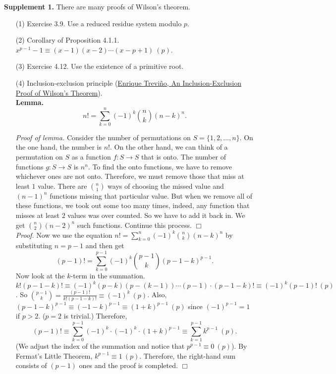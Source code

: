 \documentclass{article}
\begin{document}
\textbf{Supplement 1.}
There are many proofs of Wilson's theorem.
\begin{enumerate}
\item[(1)]
Exercise 3.9. Use a reduced residue system modulo $p$.
\item[(2)]
Corollary of Proposition 4.1.1. $x^{p - 1} - 1 \equiv (x - 1)(x - 2) \cdots (x - p + 1) \: (p)$.
\item[(3)]
Exercise 4.12. Use the existence of a primitive root.
\item[(4)]
Inclusion-exclusion principle
(\href{http://campus.lakeforest.edu/trevino/WilsonCapsule.pdf}
{Enrique Treviño, An Inclusion-Exclusion Proof of Wilson's Theorem}). \\
\textbf{Lemma.}
$$n! = \sum_{k = 0}^{n}(-1)^k {n \choose k} (n - k)^{n}.$$

\emph{Proof of lemma.}
Consider the number of permutations on $S = \{1, 2, ..., n\}$.
On the one hand, the number is $n!$.
On the other hand, we can think of a permutation on $S$ as a function
$f: S \rightarrow S$ that is onto.
The number of functions $g: S \rightarrow S$ is $n^n$.
To find the onto functions, we have to remove whichever ones are not onto.
Therefore, we must remove those that miss at least $1$ value.
There are ${n \choose 1}$ ways of choosing the missed value and ${(n - 1)}^n$
functions missing that particular value.
But when we remove all of these functions, we took out some too many times, indeed,
any function that misses at least $2$ values was over counted. So we have to add it back in.
We get ${n \choose 2} {(n - 2)}^n$ such functions. Continue this process.
$\Box$ \\

\emph{Proof.}
Now we use the equation $n! = \sum_{k = 0}^{n}(-1)^k {n \choose k} (n - k)^{n}$
by substituting $n = p - 1$ and then get
$$(p - 1)! = \sum_{k = 0}^{p - 1}(-1)^k {p - 1 \choose k} (p - 1 - k)^{p - 1}.$$
Now look at the $k$-term in the summation. \\

$k!(p - 1 - k)! \equiv (-1)^k (p - k)(p - (k - 1)) \cdots (p - 1) \cdot (p - 1 - k)!
\equiv (-1)^k (p - 1)! \: (p)$.
So ${p - 1 \choose k} = \frac{(p - 1)!}{k!(p - 1 - k)!} \equiv (-1)^k \: (p)$.
Also, ${(p - 1 - k)}^{p - 1} \equiv {(-1 - k)}^{p - 1} \equiv {(1 + k)}^{p - 1} \: (p)$
since $(-1)^{p - 1} = 1$ if $p > 2$. ($p = 2$ is trivial.) Therefore,
$$(p - 1)!
\equiv \sum_{k = 0}^{p - 1}(-1)^k \cdot (-1)^k \cdot {(1 + k)}^{p - 1}
\equiv \sum_{k = 1}^{p - 1} k^{p - 1} \: (p).$$
(We adjust the index of the summation and notice that $p^{p - 1} \equiv 0 \: (p)$).
By Fermat’s Little Theorem, $k^{p - 1} \equiv 1 \: (p)$.
Therefore, the right-hand sum consists of $(p - 1)$ ones and the proof is completed.
$\Box$ \\


\end{enumerate}
\end{document}
